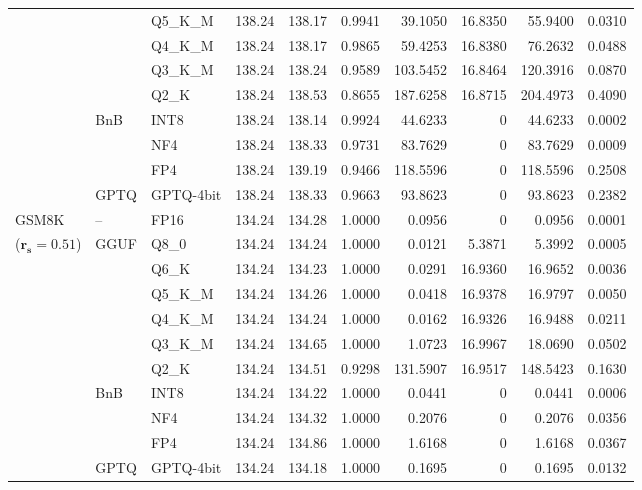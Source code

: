 \begin{longtable}{ll l rrrrrrr}
 &  & Q5\_K\_M & 138.24 & 138.17 & 0.9941 & 39.1050 & 16.8350 & 55.9400 & 0.0310 \\
 &  & Q4\_K\_M & 138.24 & 138.17 & 0.9865 & 59.4253 & 16.8380 & 76.2632 & 0.0488 \\
 &  & Q3\_K\_M & 138.24 & 138.24 & 0.9589 & 103.5452 & 16.8464 & 120.3916 & 0.0870 \\
 &  & Q2\_K & 138.24 & 138.53 & \cellcolor{red!18} 0.8655 & \cellcolor{red!18} 187.6258 & 16.8715 & \cellcolor{red!18} 204.4973 & \cellcolor{red!18} 0.4090 \\
 & BnB & INT8 & 138.24 & 138.14 & 0.9924 & 44.6233 & \cellcolor{cyan!12} $0$ & 44.6233 & 0.0002 \\
 &  & NF4 & 138.24 & 138.33 & 0.9731 & 83.7629 & \cellcolor{cyan!12} $0$ & 83.7629 & 0.0009 \\
 &  & FP4 & 138.24 & 139.19 & \cellcolor{red!18} 0.9466 & \cellcolor{red!18} 118.5596 & \cellcolor{cyan!12} $0$ & \cellcolor{red!18} 118.5596 & \cellcolor{red!18} 0.2508 \\
 & GPTQ & GPTQ-4bit & 138.24 & 138.33 & 0.9663 & 93.8623 & \cellcolor{cyan!12} $0$ & 93.8623 & 0.2382 \\
\midrule
GSM8K & -- & FP16 & 134.24 & 134.28 & 1.0000 & 0.0956 & \cellcolor{cyan!12} $0$ & 0.0956 & 0.0001 \\
{\small ($\mathbf{r_s{=}0.51}$)} & GGUF & Q8\_0 & 134.24 & 134.24 & 1.0000 & 0.0121 & 5.3871 & 5.3992 & 0.0005 \\
 &  & Q6\_K & 134.24 & 134.23 & 1.0000 & 0.0291 & 16.9360 & 16.9652 & 0.0036 \\
 &  & Q5\_K\_M & 134.24 & 134.26 & 1.0000 & 0.0418 & 16.9378 & 16.9797 & 0.0050 \\
 &  & Q4\_K\_M & 134.24 & 134.24 & 1.0000 & 0.0162 & 16.9326 & 16.9488 & 0.0211 \\
 &  & Q3\_K\_M & 134.24 & 134.65 & 1.0000 & 1.0723 & 16.9967 & 18.0690 & 0.0502 \\
 &  & Q2\_K & 134.24 & 134.51 & \cellcolor{red!18} 0.9298 & \cellcolor{red!18} 131.5907 & 16.9517 & \cellcolor{red!18} 148.5423 & \cellcolor{red!18} 0.1630 \\
 & BnB & INT8 & 134.24 & 134.22 & 1.0000 & 0.0441 & \cellcolor{cyan!12} $0$ & 0.0441 & 0.0006 \\
 &  & NF4 & 134.24 & 134.32 & 1.0000 & 0.2076 & \cellcolor{cyan!12} $0$ & 0.2076 & 0.0356 \\
 &  & FP4 & 134.24 & 134.86 & 1.0000 & 1.6168 & \cellcolor{cyan!12} $0$ & 1.6168 & 0.0367 \\
 & GPTQ & GPTQ-4bit & 134.24 & 134.18 & 1.0000 & 0.1695 & \cellcolor{cyan!12} $0$ & 0.1695 & 0.0132 \\
\end{longtable}
\endgroup